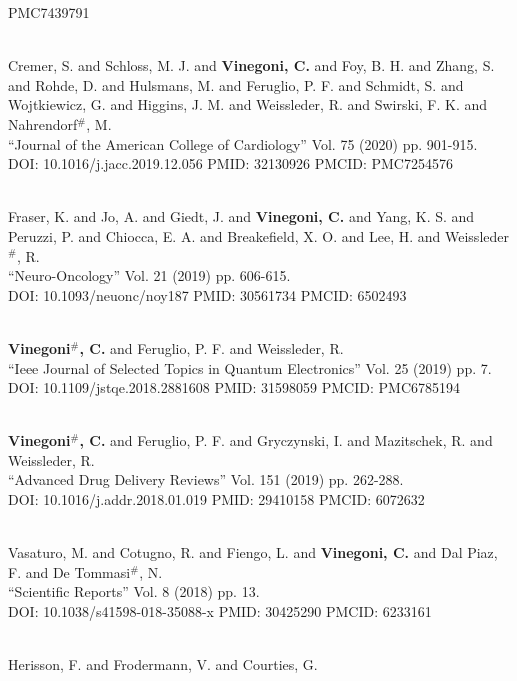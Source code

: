 PMC7439791\item {} \\ Cremer, S. and Schloss, M. J. and {\bf Vinegoni, C.} and Foy, B. H. and Zhang, S. and Rohde, D. and Hulsmans, M. and Feruglio, P. F. and Schmidt, S. and Wojtkiewicz, G. and Higgins, J. M. and Weissleder, R. and Swirski, F. K. and Nahrendorf$^\#$, M. \\ ``Journal of the American College of Cardiology'' Vol. 75 (2020) pp. 901-915. \\ DOI: 10.1016/j.jacc.2019.12.056 PMID: 32130926 PMCID: PMC7254576\item {} \\ Fraser, K. and Jo, A. and Giedt, J. and {\bf Vinegoni, C.} and Yang, K. S. and Peruzzi, P. and Chiocca, E. A. and Breakefield, X. O. and Lee, H. and Weissleder$^\#$, R. \\ ``Neuro-Oncology'' Vol. 21 (2019) pp. 606-615. \\ DOI: 10.1093/neuonc/noy187 PMID: 30561734 PMCID: 6502493\item {} \\ {\bf Vinegoni$^\#$, C.} and Feruglio, P. F. and Weissleder, R. \\ ``Ieee Journal of Selected Topics in Quantum Electronics'' Vol. 25 (2019) pp. 7. \\ DOI: 10.1109/jstqe.2018.2881608 PMID: 31598059 PMCID: PMC6785194\item {} \\ {\bf Vinegoni$^\#$, C.} and Feruglio, P. F. and Gryczynski, I. and Mazitschek, R. and Weissleder, R. \\ ``Advanced Drug Delivery Reviews'' Vol. 151 (2019) pp. 262-288. \\ DOI: 10.1016/j.addr.2018.01.019 PMID: 29410158 PMCID: 6072632\item {} \\ Vasaturo, M. and Cotugno, R. and Fiengo, L. and {\bf Vinegoni, C.} and Dal Piaz, F. and De Tommasi$^\#$, N. \\ ``Scientific Reports'' Vol. 8 (2018) pp. 13. \\ DOI: 10.1038/s41598-018-35088-x PMID: 30425290 PMCID: 6233161\item {} \\ Herisson, F. and Frodermann, V. and Courties, G. 
